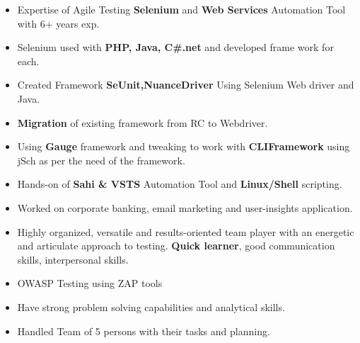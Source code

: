 

\begin{cvparagraph}

\begin{itemize}
 \item {Expertise of Agile Testing \textbf{Selenium} and \textbf{Web Services} Automation Tool with 6+ years exp.}

 \item {Selenium used with \textbf{PHP, Java, C\#.net} and developed frame work for each.}

 \item {Created Framework \textbf{SeUnit,NuanceDriver} Using Selenium Web driver and Java.}

 \item {\textbf{Migration} of existing framework from RC to Webdriver.}

 \item {Using \textbf{Gauge} framework and tweaking to work with \textbf{CLIFramework} using jSch as per the need of the framework.}

 \item {Hands-on of \textbf{Sahi \& VSTS} Automation Tool and \textbf{Linux/Shell} scripting.}

 \item {Worked on corporate banking, email marketing and user-insights application.}

 \item {Highly organized, versatile and results-oriented team player with an energetic and articulate approach to testing. \textbf{Quick learner}, good communication skills, interpersonal skills.}

 \item {OWASP Testing using ZAP tools}

 \item {Have strong problem solving capabilities and analytical skills.}

 \item {Handled Team of 5 persons with their tasks and planning.}
\end{itemize}
\end{cvparagraph}
